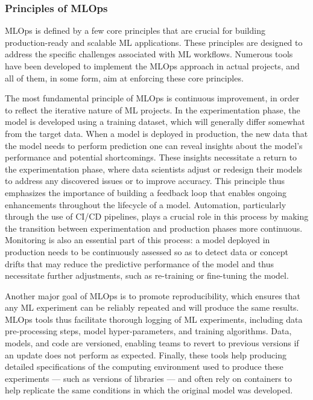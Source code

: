 \subsubsection{Principles of MLOps}

MLOps is defined by a few core principles that are crucial for building production-ready and scalable ML applications. These principles are designed to address the specific challenges associated with ML workflows. Numerous tools have been developed to implement the MLOps approach in actual projects, and all of them, in some form, aim at enforcing these core principles.

The most fundamental principle of MLOps is continuous improvement, in order to reflect the iterative nature of ML projects. In the experimentation phase, the model is developed using a training dataset, which will generally differ somewhat from the target data. When a model is deployed in production, the new data that the model needs to perform prediction one can reveal insights about the model's performance and potential shortcomings. These insights necessitate a return to the experimentation phase, where data scientists adjust or redesign their models to address any discovered issues or to improve accuracy. This principle thus emphasizes the importance of building a feedback loop that enables ongoing enhancements throughout the lifecycle of a model. Automation, particularly through the use of CI/CD pipelines, plays a crucial role in this process by making the transition between experimentation and production phases more continuous. Monitoring is also an essential part of this process: a model deployed in production needs to be continuously assessed so as to detect data or concept drifts that may reduce the predictive performance of the model and thus necessitate further adjustments, such as re-training  or fine-tuning the model.

Another major goal of MLOps is to promote reproducibility, which ensures that any ML experiment can be reliably repeated and will produce the same results. MLOps tools thus facilitate thorough logging of ML experiments, including data pre-processing steps, model hyper-parameters, and training algorithms. Data, models, and code are versioned, enabling teams to revert to previous versions if an update does not perform as expected. Finally, these tools help producing detailed specifications of the computing environment used to produce these experiments — such as versions of libraries — and often rely on containers to help replicate the same conditions in which the original model was developed.

